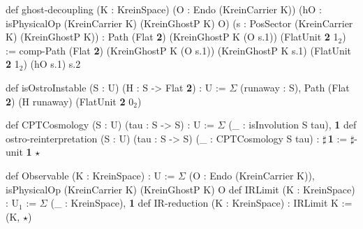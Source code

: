 \documentclass{article}
\begin{document}
def ghost-decoupling (K : KreinSpace)
\hspace*{2em}(O : Endo (KreinCarrier K))
\hspace*{2em}(hO : isPhysicalOp (KreinCarrier K) (KreinGhostP K) O)
\hspace*{2em}(s  : PosSector (KreinCarrier K) (KreinGhostP K))
\hspace*{1em}: Path (Flat \textbf{2}) (KreinGhostP K (O s.1)) (FlatUnit \textbf{2} 1$_2$)
\hspace*{1.5em}:= comp-Path (Flat \textbf{2}) (KreinGhostP K (O s.1))
\hspace*{5em}(KreinGhostP K s.1) (FlatUnit \textbf{2} 1$_2$) (hO s.1) s.2

def isOstroInstable (S : U) (H : S -> Flat \textbf{2}) : U
\hspace*{1.5em}:= $\Sigma$ (runaway : S), Path (Flat \textbf{2}) (H runaway) (FlatUnit \textbf{2} 0$_2$)

def CPTCosmology (S : U) (tau : S -> S) : U
\hspace*{1.5em}:= $\Sigma$ (\_ : isInvolution S tau), \textbf{1}
def ostro-reinterpretation (S : U) (tau : S -> S)
\hspace*{2em}(\_ : CPTCosmology S tau) : $\sharp$\,\textbf{1}
\hspace*{1.5em}:= $\sharp$-unit \textbf{1} $\star$

def Observable (K : KreinSpace) : U
\hspace*{1.5em}:= $\Sigma$ (O : Endo (KreinCarrier K)),
\hspace*{3.5em}isPhysicalOp (KreinCarrier K) (KreinGhostP K) O
def IRLimit (K : KreinSpace) : U$_1$
\hspace*{1.5em}:= $\Sigma$ (\_ : KreinSpace), \textbf{1}
def IR-reduction (K : KreinSpace) : IRLimit K := (K, $\star$)
\endgroup
\end{document}
